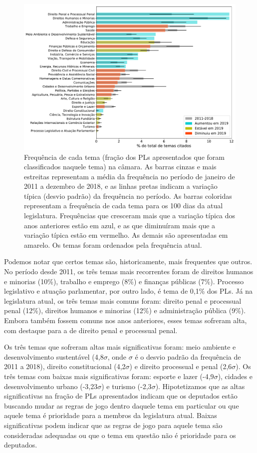\documentclass[12pt,a4paper]{article}
\begin{document}
\begin{figure}[H]
\centering
\includegraphics[width=1.0\textwidth]{graficos/temas_PL_fracao2019-vs-mediaAnterior_2019-05-03.pdf}
\caption{Frequência de cada tema (fração dos PLs apresentados que foram classificados naquele tema) na câmara.
  As barras cinzas e mais estreitas representam a média da frequência no período de janeiro de 2011 a
  dezembro de 2018, e as linhas pretas indicam a variação típica (desvio padrão) da frequência no período.
  As barras coloridas representam a frequência de cada tema para os 100 dias da atual legislatura.
  Frequências que cresceram mais que a variação típica dos anos anteriores estão em azul, e as que
  diminuíram mais que a variação típica estão em vermelho. As demais são apresentadas em amarelo.
  Os temas foram ordenados pela frequência atual.}
\label{fig:pl-por-tema-camara}
\end{figure}

Podemos notar que certos temas são, historicamente, mais frequentes que outros. No período desde 2011,
os três temas mais recorrentes foram de direitos humanos e minorias (10\%), trabalho e emprego (8\%)
e finanças públicas (7\%). Processo legislativo e atuação parlamentar, por outro lado, é tema de 0,1\%
dos PLs. Já na legislatura atual, os três temas mais comuns foram: direito penal e processual penal (12\%),
direitos humanos e minorias (12\%) e administração pública (9\%). Embora também fossem comuns nos anos
anteriores, esses temas sofreram alta, com destaque para a de direito penal e processual penal.

Os três temas que sofreram altas mais significativas foram: meio ambiente e desenvolvimento
sustentável (4,8$\sigma$, onde $\sigma$ é o desvio padrão da frequência de 2011 a 2018),
direito constitucional (4,2$\sigma$) e direito processual e penal (2,6$\sigma$). Os três
temas com baixas mais significativas foram: esporte e lazer (-4,9$\sigma$), cidades e desenvolvimento
urbano (-3,23$\sigma$) e turismo (-2,3$\sigma$). Hipotetizamos que as altas significativas
na fração de PLs apresentados indicam que os deputados estão buscando mudar as regras de jogo dentro
daquele tema em particular ou que aquele tema é prioridade para a membros da legislatura atual.
Baixas significativas podem indicar que as regras de jogo para aquele
tema são consideradas adequadas ou que o tema em questão não é prioridade para os deputados.
\end{document}
